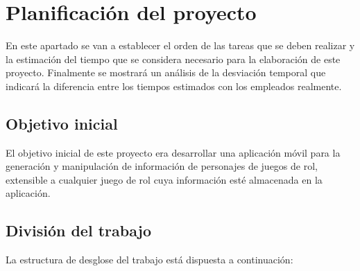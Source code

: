 
\section{Planificación del proyecto}
En este apartado se van a establecer el orden de las tareas que se 
deben realizar y la estimación del tiempo que se considera necesario 
para la elaboración de este proyecto. Finalmente se mostrará un 
análisis de la desviación temporal que indicará la diferencia entre los
tiempos estimados con los empleados realmente.

\subsection{Objetivo inicial}
El objetivo inicial de este proyecto era desarrollar una 
aplicación móvil para la generación y manipulación de información 
de personajes de juegos de rol, extensible a cualquier juego de rol 
cuya información esté almacenada en la aplicación.

\subsection{División del trabajo}
La estructura de desglose del trabajo está dispuesta a continuación: 


